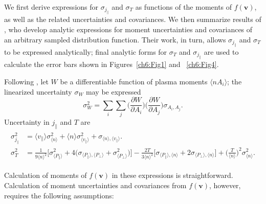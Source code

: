   We first derive expressions for $\sigma_{j_\parallel}$ and
  $\sigma_T$ as functions of the moments of $f(\mathbf{v})$, as well
  as the related uncertainties and covariances. We then summarize
  results of \citet{Gershman2015}, who develop analytic expressions
  for moment uncertainties and covariances of an arbitrary sampled
  distribution function. Their work, in turn, allows
  $\sigma_{j_\parallel}$ and $\sigma_T$ to be expressed analytically;
  final analytic forms for $\sigma_T$ and $\sigma_{j_\parallel}$ are
  used to calculate the error bars shown in Figures~\ref{ch6:Fig1} and
  ~\ref{ch6:Fig4}.

  Following \citet{Gershman2015}, let $W$ be a differentiable function
  of plasma moments $\langle n A_i \rangle $; the linearized
  uncertainty $\sigma_W$ may be expressed %
  \begin{equation} \label{appa:eqLinUnc} \sigma_W^2 =
    \sum\limits_{i}\sum\limits_{j} \bigg ( \frac{ \partial W}{\partial
      A_i} \bigg ) \bigg ( \frac{ \partial W}{\partial A_j} \bigg )
    \sigma_{A_i,A_j}.
  \end{equation}
  Uncertainty in $j_{\parallel} $ and $T$ are
    \begin{align}
      \begin{split}
        \sigma_{j_\parallel}^2 &= \langle v_\parallel \rangle
        \sigma_{\langle n \rangle}^{2} + \langle n \rangle
        \sigma_{\langle v_{\parallel} \rangle }^{2} + \sigma_{\langle n
          \rangle,\langle v_{\parallel} \rangle}.
        \\
        \sigma_T^2 &= \frac{1}{9 \langle n \rangle^2} \bigg [
        \sigma_{\langle P_{\parallel} \rangle}^2 + 4 \bigg (
        \sigma_{\langle P_{\parallel} \rangle,\langle P_{\perp} \rangle}
        + \sigma_{\langle P_{\perp} \rangle }^2 \bigg ) \bigg ] -
        \frac{2 T}{ 3 \langle n \rangle^2} \bigg [ \sigma_{\langle
          P_{\parallel} \rangle,\langle n \rangle} + 2 \sigma_{\langle
          P_{\perp} \rangle ,\langle n \rangle} \bigg ] + \bigg (
        \frac{T}{\langle n \rangle} \bigg )^2 \sigma_{\langle n
          \rangle}^2.
      \end{split}
    \end{align}

  Calculation of moments of $f(\mathbf{v})$ in these expressions is
  straightforward. Calculation of moment uncertainties and covariances
  from $f(\mathbf{v})$, however, requires the following assumptions:

